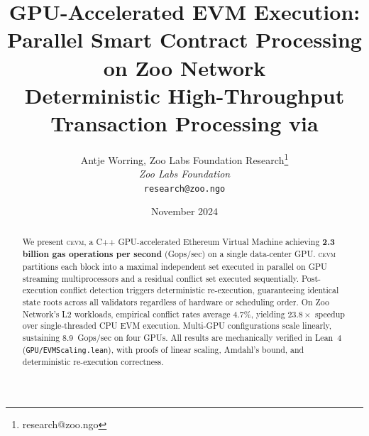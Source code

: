 \documentclass[11pt,letterpaper]{article}
\title{\textbf{GPU-Accelerated EVM Execution: Parallel Smart Contract Processing on Zoo Network}\\
\large Deterministic High-Throughput Transaction Processing via \cevm{}}
\author{
Antje Worring, Zoo Labs Foundation Research\thanks{research@zoo.ngo}\\
\textit{Zoo Labs Foundation}\\
\texttt{research@zoo.ngo}
}
\date{November 2024}
\theoremstyle{definition}
\theoremstyle{remark}
\newcommand{\cevm}{\textsc{cevm}}
\begin{document}
\zoocoverpage

\begin{abstract}
We present \cevm{}, a C++ GPU-accelerated Ethereum Virtual Machine achieving \textbf{2.3 billion gas operations per second} (Gops/sec) on a single data-center GPU.
\cevm{} partitions each block into a maximal independent set executed in parallel on GPU streaming multiprocessors and a residual conflict set executed sequentially.
Post-execution conflict detection triggers deterministic re-execution, guaranteeing identical state roots across all validators regardless of hardware or scheduling order.
On Zoo Network's L2 workloads, empirical conflict rates average 4.7\%, yielding $23.8\times$ speedup over single-threaded CPU EVM execution.
Multi-GPU configurations scale linearly, sustaining 8.9~Gops/sec on four GPUs.
All results are mechanically verified in Lean~4 (\texttt{GPU/EVMScaling.lean}), with proofs of linear scaling, Amdahl's bound, and deterministic re-execution correctness.
\end{abstract}

\tableofcontents
\newpage











\end{document}
